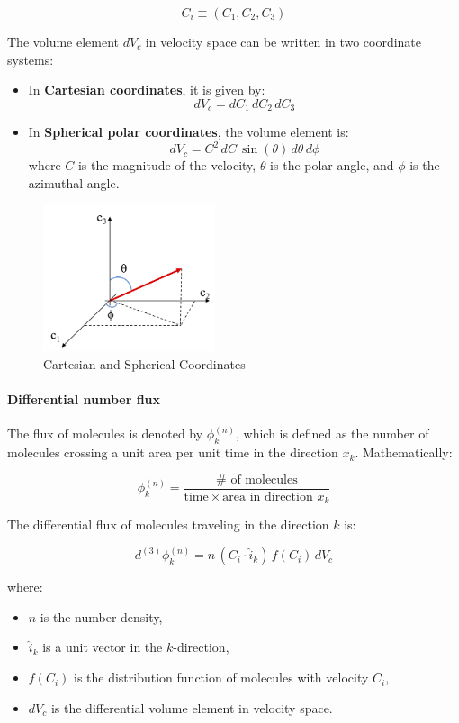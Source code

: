 \documentclass{article}
\begin{document}
\[
C_i \equiv (C_1, C_2, C_3)
\]

The volume element \( dV_c \) in velocity space can be written in two coordinate systems:

\begin{itemize}
    \item In \textbf{Cartesian coordinates}, it is given by:
    \[
    dV_c = dC_1 \, dC_2 \, dC_3
    \]
    \item In \textbf{Spherical polar coordinates}, the volume element is:
    \[
    dV_c = C^2 \, dC \, \sin(\theta) \, d\theta \, d\phi
    \]
    where \( C \) is the magnitude of the velocity, \( \theta \) is the polar angle, and \( \phi \) is the azimuthal angle.
\end{itemize}

\begin{figure}
        \centering
        \includegraphics[width=0.45\textwidth]{coord.png}
        \caption{Cartesian and Spherical Coordinates}
    \end{figure}
    
\paragraph{Differential number flux}  The flux of molecules is denoted by \( \phi_k^{(n)} \), which is defined as the number of molecules crossing a unit area per unit time in the direction \( x_k \). Mathematically:

\[
\phi_k^{(n)} = \frac{\# \text{ of molecules}}{\text{time} \times \text{area in direction } x_k}
\]

The differential flux of molecules traveling in the direction \( k \) is:

\[
d^{(3)}\phi_k^{(n)} = n \, (C_i \cdot \hat{i}_k) \, f(C_i) \, dV_c
\]

where:
\begin{itemize}
    \item \( n \) is the number density,
    \item \( \hat{i}_k \) is a unit vector in the \( k \)-direction,
    \item \( f(C_i) \) is the distribution function of molecules with velocity \( C_i \),
    \item \( dV_c \) is the differential volume element in velocity space.
\end{itemize}
\end{document}
